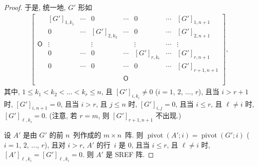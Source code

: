\documentclass[../libro.tex]{subfiles}
\begin{document}
\begin{proof}
    于是, 统一地, \(G'\) 形如
    \begin{align*}
        \begin{bmatrix}
            {}         & [G']_{1,k_1} & \cdots & 0            & \cdots     & 0            & \cdots & [G']_{1,n+1}   \\
            {}         & 0            & \cdots & [G']_{2,k_2} & \cdots     & 0            & \cdots & [G']_{2,n+1}   \\
            \mathsf{O} & \vdots       & {}     & \vdots       & {}         & \vdots       & \cdots & \vdots         \\
            {}         & 0            & \cdots & 0            & \cdots     & [G']_{r,k_r} & \cdots & [G']_{r,n+1}   \\
            {}         & 0            & \cdots & 0            & \cdots     & 0            & \cdots & [G']_{r+1,n+1} \\
            {}         & {}           & {}     & {}           & \mathsf{O} & {}           & {}     & {}             \\
        \end{bmatrix},
    \end{align*}
    其中,
    \(1 \leq k_1 < k_2 < \dots < k_r \leq n\),
    且 \([G']_{i,k_i} \neq 0\)
    (\(i = 1\), \(2\), \(\dots\), \(r\)),
    且当 \(i > r + 1\) 时, \([G']_{i,n+1} = 0\),
    且当 \(i > r\), 且 \(j \leq n\) 时,
    \([G']_{i,j} = 0\),
    且当 \(i \leq r\), 且 \(\ell \neq i\) 时,
    \([G']_{\ell,k_i} = 0\).
    (注意, 若 \(r = m\), 则 \([G']_{r+1,n+1}\) 不出现.)

    设 \(A'\) 是由 \(G'\) 的前 \(n\)~列作成的
    \(m \times n\)~阵.
    则
    \(\operatorname{pivot} {(A'; i)} = \operatorname{pivot} {(G'; i)}\)
    (\(i = 1\), \(2\), \(\dots\), \(r\)),
    且对 \(i > r\),
    \(A'\) 的行~\(i\) 是 \(0\),
    且当 \(i \leq r\), 且 \(\ell \neq i\) 时,
    \([A']_{\ell,k_i} = [G']_{\ell,k_i} = 0\).
    则 \(A'\) 是 SREF 阵.
\end{proof}
\end{document}

